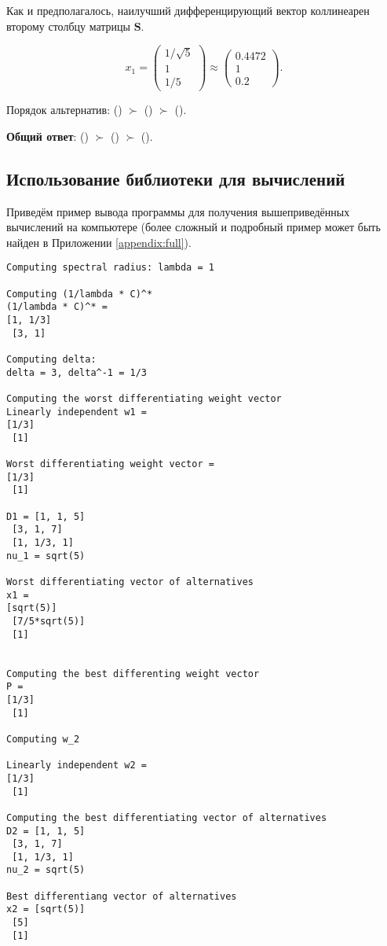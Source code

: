 \documentclass[specialist,
	substylefile = spbu_report.rtx,
	subf,href,colorlinks=true, 12pt]{disser}
\begin{document}
Как и предполагалось, наилучший дифференцирующий вектор коллинеарен второму столбцу матрицы \(\boldsymbol{S}\).

\[
	x_1 = \begin{pmatrix}
		1/\sqrt{5} \\1\\1/5
	\end{pmatrix} \approx \begin{pmatrix}
		0.4472 \\ 1 \\ 0.2
	\end{pmatrix}.
\]

Порядок альтернатив: () \(\succ\) () \(\succ\) ().

\textbf{Общий ответ}: () \(\succ\) () \(\succ\) ().

\subsection{Использование библиотеки для вычислений}
Приведём пример вывода программы для получения вышеприведённых вычислений на компьютере (более сложный и подробный пример может быть найден в Приложении \ref{appendix:full}).

\begin{verbatim}
Computing spectral radius: lambda = 1

Computing (1/lambda * C)^*
(1/lambda * C)^* =
[1, 1/3]
 [3, 1]

Computing delta:
delta = 3, delta^-1 = 1/3

Computing the worst differentiating weight vector
Linearly independent w1 =
[1/3]
 [1]

Worst differentiating weight vector =
[1/3]
 [1]

D1 = [1, 1, 5]
 [3, 1, 7]
 [1, 1/3, 1]
nu_1 = sqrt(5)

Worst differentiating vector of alternatives
x1 =
[sqrt(5)]
 [7/5*sqrt(5)]
 [1]


Computing the best differenting weight vector
P =
[1/3]
 [1]

Computing w_2

Linearly independent w2 =
[1/3]
 [1]

Computing the best differentiating vector of alternatives
D2 = [1, 1, 5]
 [3, 1, 7]
 [1, 1/3, 1]
nu_2 = sqrt(5)

Best differentiang vector of alternatives
x2 = [sqrt(5)]
 [5]
 [1]
\end{verbatim}
\end{document}
